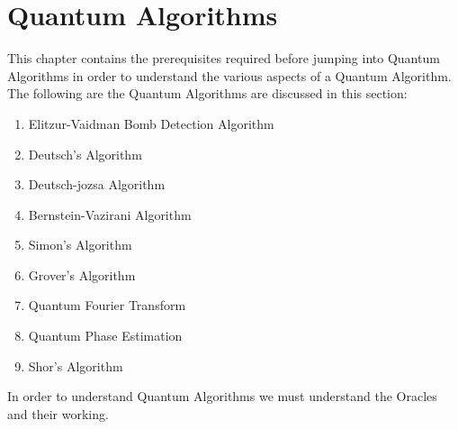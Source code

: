 \documentclass[12pt, oneside]{book}
\theoremstyle{definition}
\theoremstyle{definition}
\theoremstyle{remark}
\begin{document}
\chapter{Quantum Algorithms}
This chapter contains the prerequisites required before jumping into Quantum Algorithms in order to understand the various aspects of a Quantum Algorithm.
The following are the Quantum Algorithms are discussed in this section:
\begin{enumerate}
    \item Elitzur-Vaidman Bomb Detection Algorithm
    \item Deutsch's Algorithm
    \item Deutsch-jozsa Algorithm
    \item Bernstein-Vazirani Algorithm
    \item Simon's Algorithm
    \item Grover's Algorithm
    \item Quantum Fourier Transform
    \item Quantum Phase Estimation
    \item Shor's Algorithm
\end{enumerate}
In order to understand Quantum Algorithms we must understand the Oracles and their working.
\end{document}
